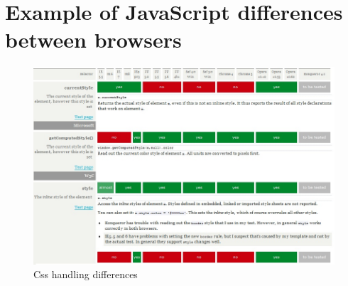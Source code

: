 \chapter{Example of JavaScript differences between browsers}\label{annexe:JavaScript differences}

\begin{figure}[!ht]
\centering
\includegraphics[width=.80\textwidth]{img/css.jpg}
\caption{Css handling differences}
\label{figure:market-brosers}
\end{figure}

